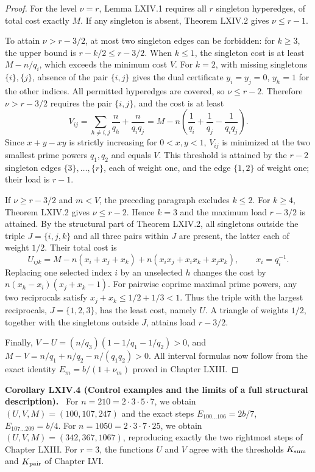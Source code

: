 \documentclass[11pt,a4paper,oneside]{book}
\newcommand{\statement}[3]{\par\medskip\noindent\textbf{#1 #2 (#3).}\ }
\begin{document}
\begin{proof}
For the level $\nu=r$, Lemma LXIV.1 requires all $r$ singleton hyperedges, of total cost exactly $M$. If any singleton is absent, Theorem LXIV.2 gives $\nu\le r-1$.

To attain $\nu>r-3/2$, at most two singleton edges can be forbidden: for $k\ge3$, the upper bound is $r-k/2\le r-3/2$. When $k\le1$, the singleton cost is at least $M-n/q_i$, which exceeds the minimum cost $V$. For $k=2$, with missing singletons $\{i\},\{j\}$, absence of the pair $\{i,j\}$ gives the dual certificate $y_i=y_j=0$, $y_h=1$ for the other indices. All permitted hyperedges are covered, so $\nu\le r-2$. Therefore $\nu>r-3/2$ requires the pair $\{i,j\}$, and the cost is at least
\[
V_{ij}=\sum_{h\ne i,j}\frac n{q_h}+\frac n{q_iq_j}
=M-n\left(\frac1{q_i}+\frac1{q_j}-\frac1{q_iq_j}\right).
\]
Since $x+y-xy$ is strictly increasing for $0<x,y<1$, $V_{ij}$ is minimized at the two smallest prime powers $q_1,q_2$ and equals $V$. This threshold is attained by the $r-2$ singleton edges $\{3\},\ldots,\{r\}$, each of weight one, and the edge $\{1,2\}$ of weight one; their load is $r-1$.

If $\nu\ge r-3/2$ and $m<V$, the preceding paragraph excludes $k\le2$. For $k\ge4$, Theorem LXIV.2 gives $\nu\le r-2$. Hence $k=3$ and the maximum load $r-3/2$ is attained. By the structural part of Theorem LXIV.2, all singletons outside the triple $J=\{i,j,k\}$ and all three pairs within $J$ are present, the latter each of weight $1/2$. Their total cost is
\[
U_{ijk}=M-n(x_i+x_j+x_k)+n(x_ix_j+x_ix_k+x_jx_k),\qquad x_i=q_i^{-1}.
\]
Replacing one selected index $i$ by an unselected $h$ changes the cost by $n(x_h-x_i)(x_j+x_k-1)$. For pairwise coprime maximal prime powers, any two reciprocals satisfy $x_j+x_k\le1/2+1/3<1$. Thus the triple with the largest reciprocals, $J=\{1,2,3\}$, has the least cost, namely $U$. A triangle of weights $1/2$, together with the singletons outside $J$, attains load $r-3/2$.

Finally, $V-U=(n/q_3)(1-1/q_1-1/q_2)>0$, and $M-V=n/q_1+n/q_2-n/(q_1q_2)>0$. All interval formulas now follow from the exact identity $E_m=b/(1+\nu_m)$ proved in Chapter LXIII.
\end{proof}

\statement{Corollary}{LXIV.4}{Control examples and the limits of a full structural description}
For $n=210=2\cdot3\cdot5\cdot7$, we obtain $(U,V,M)=(100,107,247)$ and the exact steps $E_{100\ldots106}=2b/7$, $E_{107\ldots209}=b/4$. For $n=1050=2\cdot3\cdot7\cdot25$, we obtain $(U,V,M)=(342,367,1067)$, reproducing exactly the two rightmost steps of Chapter LXIII. For $r=3$, the functions $U$ and $V$ agree with the thresholds $K_{\rm sum}$ and $K_{\rm pair}$ of Chapter LVI.
\end{document}
